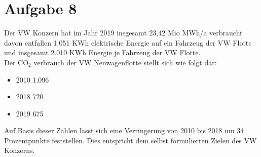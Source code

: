 \documentclass{article}
\begin{document}
\section*{Aufgabe 8}
Der VW Konzern hat im Jahr 2019 insgesamt 23,42 Mio MWh/a verbraucht davon entfallen 1.051 KWh elektrische Energie auf ein Fahrzeug der VW Flotte und insgesamt 2.010 KWh Energie je Fahrzeug der VW Flotte. \\
Der CO$_{2}$ verbrauch der VW Neuwagenflotte stellt sich wie folgt dar: \\
\begin{itemize}
	\item 2010 1.096
	\item 2018 720
	\item 2019 675
\end{itemize}
Auf Basis dieser Zahlen lässt sich eine Verringerung von 2010 bis 2018 um 34 Prozentpunkte feststellen. Dies entspricht dem selbst formulierten Zielen des VW Konzerns. 
\end{document}
